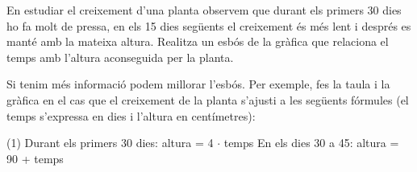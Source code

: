 \begin{mylist}
\answers[cols=1]{[$y=0.03 x$, $1.65$ \euro{}, 80 minuts]}
 

\exer  En estudiar el creixement d'una planta observem que durant els primers 30 dies ho fa molt de pressa, en els 15 dies següents el creixement és més lent i després es manté amb la mateixa altura. Realitza un esbós de la gràfica que relaciona el temps amb l'altura aconseguida per la planta.


 Si tenim més informació podem millorar l'esbós. Per exemple, fes la taula i la gràfica en el cas que el creixement de la planta s'ajusti a les següents fórmules (el temps s'expressa en dies i l'altura en centímetres):
\begin{tasks}(1)
\task  Durant els primers 30 dies:  altura = 4 $\cdot$ temps
\task En els dies 30 a 45: altura = 90 + temps
 \end{tasks}

\end{mylist}
